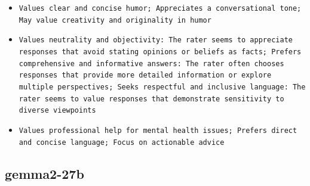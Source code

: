 \documentclass[11pt]{article}
\begin{document}
\begin{itemize}
\item \texttt{Values clear and concise humor; Appreciates a conversational tone; May value creativity and originality in humor}
\item \texttt{Values neutrality and objectivity:  The rater seems to appreciate responses that avoid stating opinions or beliefs as facts; Prefers comprehensive and informative answers:  The rater often chooses responses that provide more detailed information or explore multiple perspectives; Seeks respectful and inclusive language:  The rater seems to value responses that demonstrate sensitivity to diverse viewpoints}
\item \texttt{Values professional help for mental health issues; Prefers direct and concise language; Focus on actionable advice}
\end{itemize}

\subsection{gemma2-27b}
\end{document}
